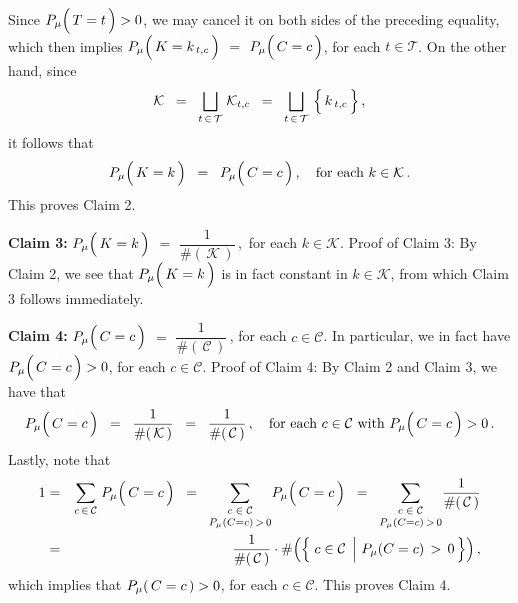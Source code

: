 Since $P_{\mu}\!\left(\, T \overset{{\color{white}1}}{=} t \,\right) > 0$,
we may cancel it on both sides of the preceding equality, which then implies
$P_{\mu}\!\left(\,K \overset{{\color{white}1}}{=} k_{\,t,c}\,\right)$
$=$ $P_{\mu}\!\left(\,C \overset{{\color{white}1}}{=} c\,\right)$,
for each $t \in \mathcal{T}$.
On the other hand, since
\begin{equation*}
\mathcal{K}
\;\; = \;\;
	\underset{t\,\in\,\mathcal{T}}{\bigsqcup}\; \mathcal{K}_{t,c}
\;\; = \;\;
	\underset{t\,\in\,\mathcal{T}}{\bigsqcup}\, \left\{\, \overset{{\color{white}.}}{k}_{\,t,c}\, \right\},
\end{equation*}
it follows that
\begin{equation*}
P_{\mu}\!\left(\,K \overset{{\color{white}1}}{=} k\,\right)
\;\; = \;\;
	P_{\mu}\!\left(\,C \overset{{\color{white}1}}{=} c\,\right),
\quad
\textnormal{for each $k \in \mathcal{K}$}\,.
\end{equation*}
This proves Claim 2.

\vskip 0.5cm
\noindent
\textbf{Claim 3:}\quad
$P_{\mu}\!\left(\,K \overset{{\color{white}1}}{=} k\,\right)$
$=$ $\dfrac{1}{\#\!\left(\,\mathcal{K}\,\right)}$\,,\,
for each $k \in \mathcal{K}$. 
\vskip 0.2cm
\noindent
Proof of Claim 3:\quad
By Claim 2, we see that $P_{\mu}\!\left(\,K \overset{{\color{white}1}}{=} k\,\right)$
is in fact constant in $k \in \mathcal{K}$, from which Claim 3 follows immediately.


\vskip 0.5cm
\noindent
\textbf{Claim 4:}\quad
$P_{\mu}\!\left(\,C \overset{{\color{white}1}}{=} c\,\right)$
$=$ $\dfrac{1}{\#\!\left(\,\mathcal{C}\,\right)}$\,,
for each $c \in \mathcal{C}$.
In particular, we in fact have
$P_{\mu}\!\left(\, C \overset{{\color{white}1}}{=} c \,\right) > 0$,
for each $c \in \mathcal{C}$.
\vskip 0.2cm
\noindent
Proof of Claim 4:\quad
By Claim 2 and Claim 3, we have that
\begin{equation*}
P_{\mu}\!\left(\, C \overset{{\color{white}1}}{=} c \,\right)
\;\; = \;\;
	\dfrac{1}{\#\!\left(\,\mathcal{K}\,\right)}
\;\; = \;\;
	\dfrac{1}{\#\!\left(\,\mathcal{C}\,\right)}\,,
\quad
\textnormal{for each $c \in \mathcal{C}$ with $P_{\mu}\!\left(\, C \overset{{\color{white}1}}{=} c \,\right) > 0$}\,.
\end{equation*}
Lastly, note that
\begin{eqnarray*}
1
& = &
	\underset{c\,\in\,\mathcal{C}}{\sum}\; P_{\mu}\!\left(\, C \overset{{\color{white}1}}{=} c \,\right)
\;\; = \;\;
	\underset{P_{\mu}(C=c)\,>\,0}{\underset{c\;\in\;\mathcal{C}}{\sum}}
	P_{\mu}\!\left(\, C \overset{{\color{white}1}}{=} c \,\right)
\;\; = \;\;
	\underset{P_{\mu}(C=c)\,>\,0}{\underset{c\;\in\;\mathcal{C}}{\sum}}
	\dfrac{1}{\#\!\left(\,\mathcal{C}\,\right)}
\\
& = &
	\dfrac{1}{\#\!\left(\,\mathcal{C}\,\right)}
	\cdot
	\#\!\left(\left\{\,\left. c \overset{{\color{white}.}}{\in} \mathcal{C} \;\,\right\vert\, P_{\mu}(C=c)\,>\,0 \,\right\}\right),
\end{eqnarray*}
which implies that $P_{\mu}\!\left(\,C \overset{{\color{white}.}}{=} c\,\right) > 0$,
for each $c \in \mathcal{C}$.
This proves Claim 4.

